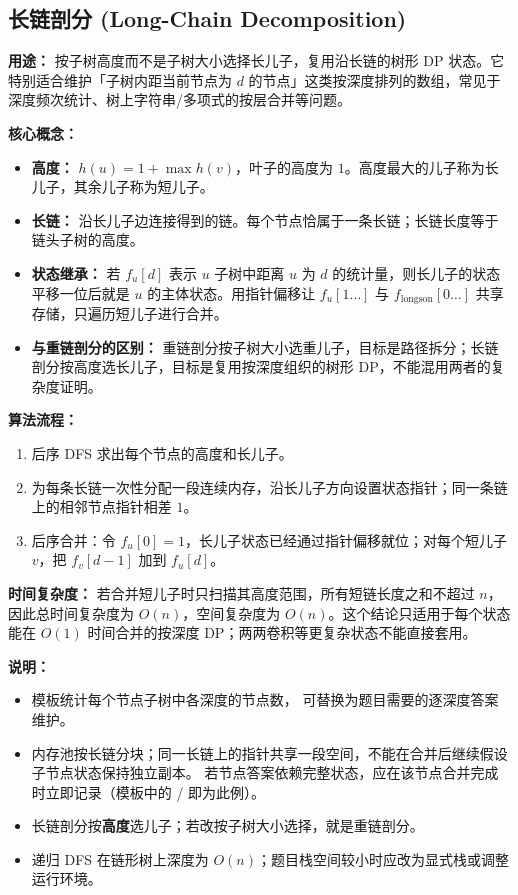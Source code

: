

\subsection{长链剖分 (Long-Chain Decomposition)}

\textbf{用途：}
按子树高度而不是子树大小选择长儿子，复用沿长链的树形 DP 状态。它特别适合维护「子树内距当前节点为 $d$ 的节点」这类按深度排列的数组，常见于深度频次统计、树上字符串/多项式的按层合并等问题。

\textbf{核心概念：}
\begin{itemize}
  \item \textbf{高度：} $h(u)=1+\max h(v)$，叶子的高度为 $1$。高度最大的儿子称为长儿子，其余儿子称为短儿子。
  \item \textbf{长链：} 沿长儿子边连接得到的链。每个节点恰属于一条长链；长链长度等于链头子树的高度。
  \item \textbf{状态继承：} 若 $f_u[d]$ 表示 $u$ 子树中距离 $u$ 为 $d$ 的统计量，则长儿子的状态平移一位后就是 $u$ 的主体状态。用指针偏移让 $f_u[1\ldots]$ 与 $f_{\mathrm{long son}}[0\ldots]$ 共享存储，只遍历短儿子进行合并。
  \item \textbf{与重链剖分的区别：} 重链剖分按子树大小选重儿子，目标是路径拆分；长链剖分按高度选长儿子，目标是复用按深度组织的树形 DP，不能混用两者的复杂度证明。
\end{itemize}

\textbf{算法流程：}
\begin{enumerate}
  \item 后序 DFS 求出每个节点的高度和长儿子。
  \item 为每条长链一次性分配一段连续内存，沿长儿子方向设置状态指针；同一条链上的相邻节点指针相差 $1$。
  \item 后序合并：令 $f_u[0]=1$，长儿子状态已经通过指针偏移就位；对每个短儿子 $v$，把 $f_v[d-1]$ 加到 $f_u[d]$。
\end{enumerate}

\textbf{时间复杂度：}
若合并短儿子时只扫描其高度范围，所有短链长度之和不超过 $n$，因此总时间复杂度为 $O(n)$，空间复杂度为 $O(n)$。这个结论只适用于每个状态能在 $O(1)$ 时间合并的按深度 DP；两两卷积等更复杂状态不能直接套用。



\textbf{说明：}
\begin{itemize}
  \item 模板统计每个节点子树中各深度的节点数， 可替换为题目需要的逐深度答案维护。
  \item 内存池按长链分块；同一长链上的指针共享一段空间，不能在合并后继续假设子节点状态保持独立副本。
        若节点答案依赖完整状态，应在该节点合并完成时立即记录（模板中的  /  即为此例）。
  \item 长链剖分按\textbf{高度}选儿子；若改按子树大小选择，就是重链剖分。
  \item 递归 DFS 在链形树上深度为 $O(n)$；题目栈空间较小时应改为显式栈或调整运行环境。
\end{itemize}

